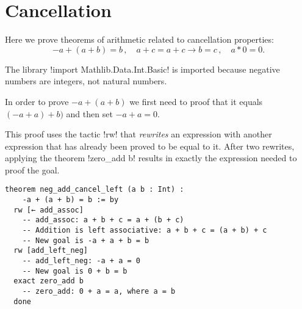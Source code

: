 
\section{Cancellation}

Here we prove theorems of arithmetic related to cancellation properties:
\[
-a+(a+b) =b\,,\quad a+c=a+c \rightarrow b= c\,,\quad a*0 =0.
\]

The library !import Mathlib.Data.Int.Basic! is imported because negative numbers are integers, not natural numbers.


In order to prove $- a + (a + b)$ we first need to proof that it equals $(-a + a) + b)$ and then set $-a + a = 0$.

This proof uses the tactic !rw! that \emph{rewrites} an expression with another expression that has already been proved to be equal to it. After two rewrites, applying the theorem !zero_add b! results in exactly the expression needed to proof the goal.

\begin{Verbatim}
theorem neg_add_cancel_left (a b : Int) :
    -a + (a + b) = b := by
  rw [← add_assoc]
    -- add_assoc: a + b + c = a + (b + c)
    -- Addition is left associative: a + b + c = (a + b) + c
    -- New goal is -a + a + b = b
  rw [add_left_neg]
    -- add_left_neg: -a + a = 0
    -- New goal is 0 + b = b
  exact zero_add b
    -- zero_add: 0 + a = a, where a = b
  done
\end{Verbatim}


